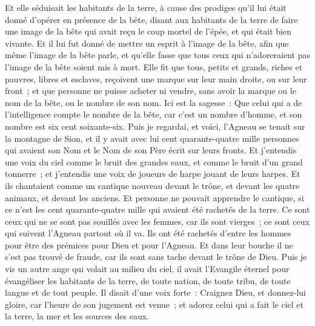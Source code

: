 \begin{multicols}{2}
Et elle séduisait les habitants de la terre, à cause des prodiges qu'il lui était donné d'opérer en présence de la bête, disant aux habitants de la terre de faire une image de la bête qui avait reçu le coup mortel de l'épée, et qui était bien vivante.
Et il lui fut donné de mettre un esprit à l'image de la bête, afin que même l'image de la bête parle, et qu'elle fasse que tous ceux qui n'adoreraient pas l'image de la bête soient mis à mort.
Elle fit que tous, petits et grands, riches et pauvres, libres et esclaves, reçoivent une marque sur leur main droite, ou sur leur front~;
et que personne ne puisse acheter ni vendre, sans avoir la marque ou le nom de la bête, ou le nombre de son nom.
Ici est la sagesse~: Que celui qui a de l'intelligence compte le nombre de la bête, car c'est un nombre d'homme, et son nombre est six cent soixante-six.
\VerseOne{}Puis je regardai, et voici, l'Agneau se tenait sur la montagne de Sion, et il y avait avec lui cent quarante-quatre mille personnes qui avaient son Nom et le Nom de son Père écrit sur leurs fronts.
Et j'entendis une voix du ciel comme le bruit des grandes eaux, et comme le bruit d'un grand tonnerre~; et j'entendis une voix de joueurs de harpe jouant de leurs harpes.
Et ils chantaient comme un cantique nouveau devant le trône, et devant les quatre animaux, et devant les anciens. Et personne ne pouvait apprendre le cantique, si ce n'est les cent quarante-quatre mille qui avaient été rachetés de la terre.
Ce sont ceux qui ne se sont pas souillés avec les femmes, car ils sont vierges~; ce sont ceux qui suivent l'Agneau partout où il va. Ils ont été rachetés d'entre les hommes pour être des prémices pour Dieu et pour l'Agneau.
Et dans leur bouche il ne s'est pas trouvé de fraude, car ils sont sans tache devant le trône de Dieu.
Puis je vis un autre ange qui volait au milieu du ciel, il avait l'Evangile éternel pour évangéliser les habitants de la terre, de toute nation, de toute tribu, de toute langue et de tout peuple.
Il disait d'une voix forte~: Craignez Dieu, et donnez-lui gloire, car l'heure de son jugement est venue~; et adorez celui qui a fait le ciel et la terre, la mer et les sources des eaux.

\end{multicols}
